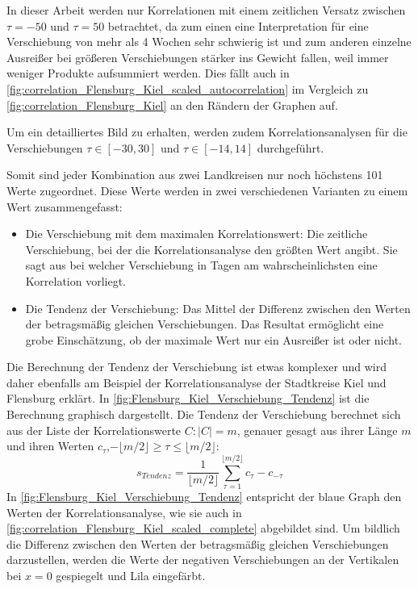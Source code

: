 In dieser Arbeit werden nur Korrelationen mit einem zeitlichen Versatz zwischen $\tau=-50$ und $\tau=50$ betrachtet, da zum einen eine Interpretation für eine Verschiebung von mehr als 4 Wochen sehr schwierig ist und zum anderen einzelne Ausreißer bei größeren Verschiebungen stärker ins Gewicht fallen, weil immer weniger Produkte aufsummiert werden. Dies fällt auch in \autoref{fig:correlation_Flensburg_Kiel_scaled_autocorrelation} im Vergleich zu \autoref{fig:correlation_Flensburg_Kiel} an den Rändern der Graphen auf.

Um ein detailliertes Bild zu erhalten, werden zudem Korrelationsanalysen für die Verschiebungen $\tau\in[-30,30]$ und $\tau\in[-14,14]$ durchgeführt.

Somit sind jeder Kombination aus zwei Landkreisen nur noch höchstens 101 Werte zugeordnet. Diese Werte werden in zwei verschiedenen Varianten zu einem Wert zusammengefasst:
\begin{itemize}
    \item Die Verschiebung mit dem maximalen Korrelationswert: Die zeitliche Verschiebung, bei der die Korrelationsanalyse den größten Wert angibt. Sie sagt aus bei welcher Verschiebung in Tagen am wahrscheinlichsten eine Korrelation vorliegt.
    \item Die Tendenz der Verschiebung: 
    Das Mittel der Differenz zwischen den Werten der betragsmäßig gleichen Verschiebungen.
    Das Resultat ermöglicht eine grobe Einschätzung, ob der maximale Wert nur ein Ausreißer ist oder nicht.
\end{itemize}

Die Berechnung der Tendenz der Verschiebung ist etwas komplexer und wird daher ebenfalls am Beispiel der Korrelationsanalyse der Stadtkreise Kiel und Flensburg erklärt.
In \autoref{fig:Flensburg_Kiel_Verschiebung_Tendenz} ist die Berechnung graphisch dargestellt.
Die Tendenz der Verschiebung berechnet sich aus der Liste der Korrelationswerte $C:\vert C\vert =m$, genauer gesagt aus ihrer Länge $m$ und ihren Werten $c_\tau$,$ -\lfloor m/2 \rfloor\geq \tau\leq \lfloor m/2 \rfloor$:
\begin{equation}
    s_{Tendenz} = \frac{1}{\lfloor m/2 \rfloor}
    \sum_{\tau=1}^{\lfloor m/2 \rfloor}c_{\tau}-c_{-\tau}
\end{equation}
In \autoref{fig:Flensburg_Kiel_Verschiebung_Tendenz} entspricht der blaue Graph den Werten der Korrelationsanalyse, wie sie auch in \autoref{fig:correlation_Flensburg_Kiel_scaled_complete} abgebildet sind. Um bildlich die Differenz zwischen den Werten der betragsmäßig gleichen Verschiebungen darzustellen, werden die Werte der negativen Verschiebungen an der Vertikalen bei $x=0$ gespiegelt und Lila eingefärbt.


